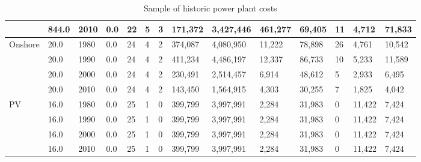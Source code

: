 \begin{table}[]
\begin{tabular}{|l|l|l|l|l|l|l|l|l|l|l|l|l|l|}
		& 844.0 & 2010 & 0.0 & 22 & 5 & 3 & 171,372 & 3,427,446 & 461,277 & 69,405 & 11 & 4,712 & 71,833 \\ \hline
		\multirow{4}{*}{Onshore} & 20.0 & 1980 & 0.0 & 24 & 4 & 2 & 374,087 & 4,080,950 & 11,222 & 78,898 & 26 & 4,761 & 10,542 \\ \cline{2-14} 
		& 20.0 & 1990 & 0.0 & 24 & 4 & 2 & 411,234 & 4,486,197 & 12,337 & 86,733 & 10 & 5,233 & 11,589 \\ \cline{2-14} 
		& 20.0 & 2000 & 0.0 & 24 & 4 & 2 & 230,491 & 2,514,457 & 6,914 & 48,612 & 5 & 2,933 & 6,495 \\ \cline{2-14} 
		& 20.0 & 2010 & 0.0 & 24 & 4 & 2 & 143,450 & 1,564,915 & 4,303 & 30,255 & 7 & 1,825 & 4,042 \\ \hline
		\multirow{4}{*}{PV} & 16.0 & 1980 & 0.0 & 25 & 1 & 0 & 399,799 & 3,997,991 & 2,284 & 31,983 & 0 & 11,422 & 7,424 \\ \cline{2-14} 
		& 16.0 & 1990 & 0.0 & 25 & 1 & 0 & 399,799 & 3,997,991 & 2,284 & 31,983 & 0 & 11,422 & 7,424 \\ \cline{2-14} 
		& 16.0 & 2000 & 0.0 & 25 & 1 & 0 & 399,799 & 3,997,991 & 2,284 & 31,983 & 0 & 11,422 & 7,424 \\ \cline{2-14} 
		& 16.0 & 2010 & 0.0 & 25 & 1 & 0 & 399,799 & 3,997,991 & 2,284 & 31,983 & 0 & 11,422 & 7,424 \\ \hline
	\end{tabular}
	\label{table:historic_plant_costs}
	\caption{Sample of historic power plant costs}
\end{table}

